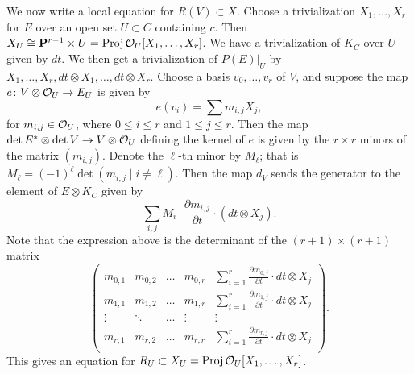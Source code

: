 We now write a local equation for $R(V) \subset X$.
Choose a trivialization $X_1, \dots, X_r$ for $E$ over an open set $U \subset C$ containing $c$.
Then $X_U \cong {\bf P}^{r-1} \times U = {\text{\rm Proj}\,} \mathcal O_U[X_1, \dots, X_r]$.
We have a trivialization of $K_C$ over $U$ given by $dt$.
We then get a trivialization of $P(E)|_U$ by $X_1, \dots, X_r, dt \otimes X_1, \dots, dt \otimes X_r$.
Choose a basis $v_0, \dots, v_r$ of $V$, and suppose the map $e {\colon} V \otimes \mathcal O_U \to E_U$ is given by
\[ e(v_i) = \sum m_{i,j} X_j,\]
for $m_{i,j} \in \mathcal O_U$, where $0 \leq i \leq r$ and $1 \leq j \leq r$.
Then the map $\det E^* \otimes \det V \to V \otimes \mathcal O_U$ defining the kernel of $e$ is given by the $r \times r$ minors of the matrix $(m_{i,j})$.
Denote the $\ell$-th minor by $M_\ell$; that is $M_\ell = (-1)^{\ell}\det (m_{i,j} \mid i \neq \ell)$.
Then the map $d_V$ sends the generator to the element of $E \otimes K_C$ given by
\[ \sum_{i,j} M_i \cdot \frac{\partial m_{i,j}}{\partial t} \cdot (dt \otimes X_j).\]
Note that the expression above is the determinant of the $(r+1) \times (r+1)$ matrix
\begin{equation}\label{eqn:Rmatrix}
  \begin{pmatrix}
  m_{0,1} & m_{0,2} & \dots & m_{0,r} & \sum_{i = 1}^r \frac {\partial m_{0,j}}{\partial t} \cdot dt \otimes X_j \\
  m_{1,1} & m_{1,2} & \dots & m_{1,r} & \sum_{i = 1}^r \frac {\partial m_{1,j}}{\partial t} \cdot dt \otimes X_j \\
  \vdots & \ddots & \dots & \vdots & \vdots \\
  m_{r,1} & m_{r,2} & \dots & m_{r,r} & \sum_{i = 1}^r \frac {\partial m_{r,j}}{\partial t} \cdot dt \otimes X_j \\
\end{pmatrix}.
\end{equation}
This gives an equation for $R_U \subset X_U = {\text{\rm Proj}\,} \mathcal O_U[X_1, \dots, X_r]$.

